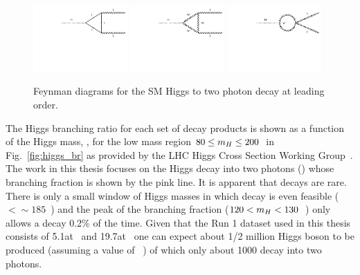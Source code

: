 \begin{figure}
  \includegraphics[width=0.32\textwidth]{theory/plots/Htgg.pdf}
  \includegraphics[width=0.32\textwidth]{theory/plots/HWgg.pdf}
  \includegraphics[width=0.32\textwidth]{theory/plots/HWgg4.pdf}
  \caption{Feynman diagrams for the \acs{SM} Higgs to two photon decay at leading order.}
  \label{fig:feyn_hgg_decay}
\end{figure}


The \SM Higgs branching ratio for each set of decay products is shown as a function of the Higgs mass, \mH, for the low mass region $80\leq m_{H}\leq 200$~\GeV in Fig.~\ref{fig:higgs_br} as provided by the LHC Higgs Cross Section Working Group~\cite{LHCHiggsCrossSectionWorkingGroup3}. The work in this thesis focuses on the Higgs decay into two photons (\Hgg) whose branching fraction is shown by the pink line. It is apparent that \Hgg decays are rare. There is only a small window of Higgs masses in which \Hgg decay is even feasible (\mH$<\sim185$~\GeV) and the peak of the branching fraction ($120<m_{H}<130$~\GeV) only allows a \SM \Hgg decay 0.2\% of the time. Given that the \LHC Run 1 dataset used in this thesis consists of 5.1\fbinv at ~\TeV and 19.7\fbinv at ~\TeV one can expect about 1/2 million \SM Higgs boson to be produced (assuming a value of ~\GeV) of which only about 1000 decay into two photons. 

